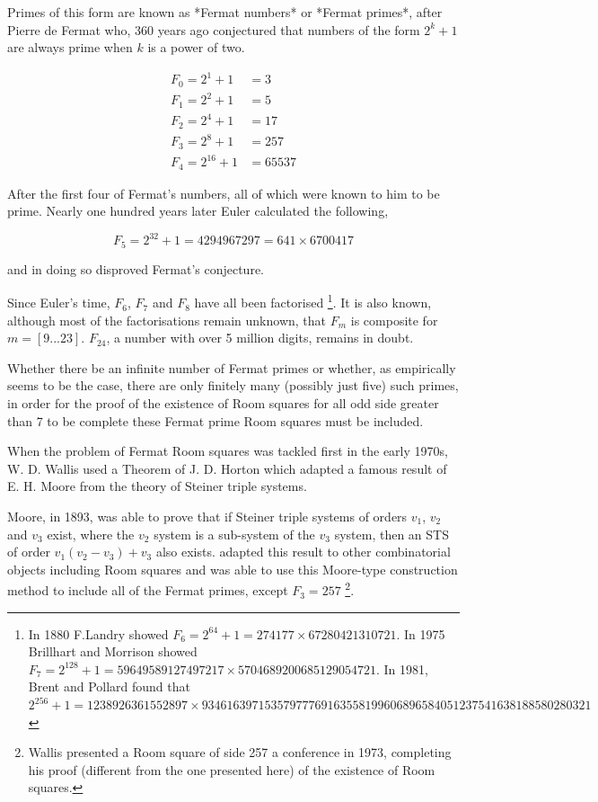 \documentclass[11pt, a4paper]{book}\usepackage[]{graphicx}\usepackage[]{xcolor}
\begin{document}
Primes of this form are known as *Fermat numbers* or
*Fermat primes*, after Pierre de Fermat who, 360 years ago
conjectured that numbers of the form $2^k + 1$ are always
prime when $k$ is a power of two.

\begin{align*}
  F_0 = 2^1 + 1 &= 3 \\
  F_1 = 2^2 + 1 &= 5 \\
  F_2 = 2^4 + 1 &= 17 \\
  F_3 = 2^8 + 1 &= 257 \\
  F_4 = 2^{16} + 1 &= 65537
\end{align*}

After the first four of Fermat’s numbers, all of which were
known to him to be prime. Nearly one hundred years later
Euler calculated the following,

\begin{equation}
F_5 = 2^{32}+1 = 4294967297 = 641\times 6700417
\end{equation}

and in doing so disproved Fermat’s conjecture.

Since Euler’s time, $F_6$, $F_7$ and $F_8$ have all been
factorised
\footnote{In 1880 F.Landry showed
    $F_6=2^{64}+1=274177 \times 67280421310721$. In 1975 Brillhart and
    Morrison showed
    $F_7=2^{128}+1=59649589127497217 \times 5704689200685129054721$. In
    1981, Brent and Pollard found that\
    $2^{256}+1=1238926361552897 \times
    93461639715357977769163558199606896584051237541638188580280321$}.
It is also known, although most of the
factorisations remain unknown, that $F_m$ is composite for
$m = [9...23]$. $F_{24}$, a number with over 5 million digits,
remains in doubt.

Whether there be an infinite number of Fermat primes or
whether, as empirically seems to be the case, there are only
finitely many (possibly just five) such primes, in order for
the proof of the existence of Room squares for all odd side
greater than 7 to be complete these Fermat prime Room
squares must be included.

When the problem of Fermat Room squares was tackled first in
the early 1970s, W. D. Wallis used a Theorem of J. D. Horton
which adapted a famous result of E. H. Moore from the theory
of Steiner triple systems.

Moore, in 1893, was able to prove that if Steiner triple
systems of orders $v_1$, $v_2$ and $v_3$ exist, where the
$v_2$ system is a sub-system of the $v_3$ system, then an
STS of order $v_1(v_2 - v_3) + v_3$ also exists.
\cite{hortonVariationsThemeMoore1970}
adapted this result to other combinatorial objects including
Room squares and
\cite{wallisCombinatoricsRoomSquares2006}
was able
to use this Moore-type construction method to include all
of the Fermat primes, except $F_3 = 257$
\footnote{Wallis presented a Room square of side 257 a conference in 1973,
    completing his proof (different from the one presented here) of the
    existence of Room squares.}.
\end{document}
